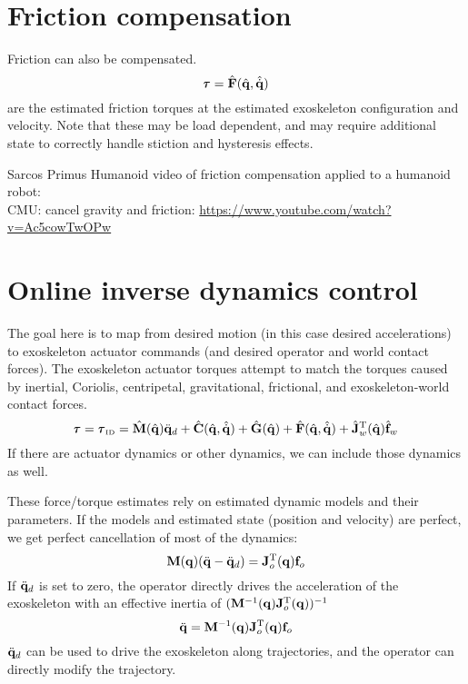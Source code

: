 \documentclass[letterpaper,12pt,fullpage]{article}
\newcommand{\invdyn}{{\mbox {\tiny ID}}}
\begin{document}
\section{Friction compensation}

Friction can also be compensated.
\begin{equation}
\vtau = \hat{\mF}(\hat{\vq},\hat{\dot{\vq}}) 
\end{equation}
are the estimated friction torques at the estimated exoskeleton configuration
and velocity.
Note that these may be load dependent, and may require additional state to
correctly handle stiction and hysteresis effects.

Sarcos Primus Humanoid video of friction compensation applied
to a humanoid robot:\\
CMU: cancel gravity and friction: \url{https://www.youtube.com/watch?v=Ac5cowTwOPw}\\

\section{Online inverse dynamics control}
\label{sec:invdyn}

The goal here is to map from desired motion (in this case desired
accelerations) to exoskeleton actuator commands (and desired operator
and world contact forces).
The exoskeleton actuator torques
attempt to match the torques caused by inertial, Coriolis, centripetal,
gravitational, frictional, and exoskeleton-world contact forces.
\begin{equation}
\vtau = \vtau_{\invdyn} 
= \hat{\mM}(\hat{\vq}) \ddot{\vq}_d
+ \hat{\mC}(\hat{\vq},\hat{\dot{\vq}})
+ \hat{\mG}(\hat{\vq})
+ \hat{\mF}(\hat{\vq},\hat{\dot{\vq}})
+ \hat{\mJ}_w^{\tr}(\hat{\vq}) \hat{\vf}_w
\end{equation}
If there are actuator dynamics or other dynamics, we can include those
dynamics as well.

These force/torque estimates rely on estimated dynamic models and their parameters.
If the models and estimated state (position and velocity) are perfect, we get
perfect cancellation of most of the dynamics:
\begin{equation}
{\bf M}({\bf q}) (\ddot{{\bf q}} - \ddot{{\bf q}}_d) = {\bf J}_o^{{\rm T}}({\bf q}) {\bf f}_o
\end{equation}
If $\ddot{{\bf q}}_d$ is set to zero, the operator directly drives the acceleration
of the exoskeleton with an effective inertia of $({\bf M}^{-1}({\bf q}) {\bf J}_o^{{\rm T}}({\bf q}))^{-1}$
\begin{equation}
\ddot{{\bf q}} = {\bf M}^{-1}({\bf q}) {\bf J}_o^{{\rm T}}({\bf q}) {\bf f}_o
\label{eq:cancel}
\end{equation}
$\ddot{{\bf q}}_d$ can be used to drive the exoskeleton along trajectories, and
the operator can directly modify the trajectory.
\end{document}
